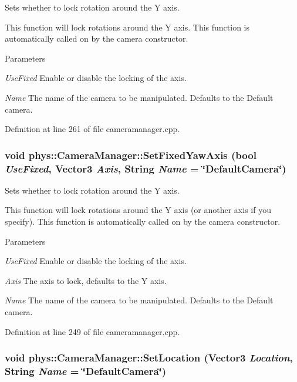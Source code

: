 Sets whether to lock rotation around the Y axis. 

This function will lock rotations around the Y axis. This function is automatically called on by the camera constructor. 
\begin{DoxyParams}{Parameters}
\item[{\em UseFixed}]Enable or disable the locking of the axis. \item[{\em Name}]The name of the camera to be manipulated. Defaults to the Default camera. \end{DoxyParams}


Definition at line 261 of file cameramanager.cpp.

\hypertarget{classphys_1_1CameraManager_ac29a1b3cd34ff2810bee170aa233c77e}{
\subsubsection[{SetFixedYawAxis}]{\setlength{\rightskip}{0pt plus 5cm}void phys::CameraManager::SetFixedYawAxis (bool {\em UseFixed}, \/  {\bf Vector3} {\em Axis}, \/  {\bf String} {\em Name} = {\ttfamily \char`\"{}DefaultCamera\char`\"{}})}}
\label{d9/d91/classphys_1_1CameraManager_ac29a1b3cd34ff2810bee170aa233c77e}


Sets whether to lock rotation around the Y axis. 

This function will lock rotations around the Y axis (or another axis if you specify). This function is automatically called on by the camera constructor. 
\begin{DoxyParams}{Parameters}
\item[{\em UseFixed}]Enable or disable the locking of the axis. \item[{\em Axis}]The axis to lock, defaults to the Y axis. \item[{\em Name}]The name of the camera to be manipulated. Defaults to the Default camera. \end{DoxyParams}


Definition at line 249 of file cameramanager.cpp.

\hypertarget{classphys_1_1CameraManager_a3f1b48057ca2c1cd79f3e61c9fcbe1b4}{
\subsubsection[{SetLocation}]{\setlength{\rightskip}{0pt plus 5cm}void phys::CameraManager::SetLocation ({\bf Vector3} {\em Location}, \/  {\bf String} {\em Name} = {\ttfamily \char`\"{}DefaultCamera\char`\"{}})}}
\label{d9/d91/classphys_1_1CameraManager_a3f1b48057ca2c1cd79f3e61c9fcbe1b4}


